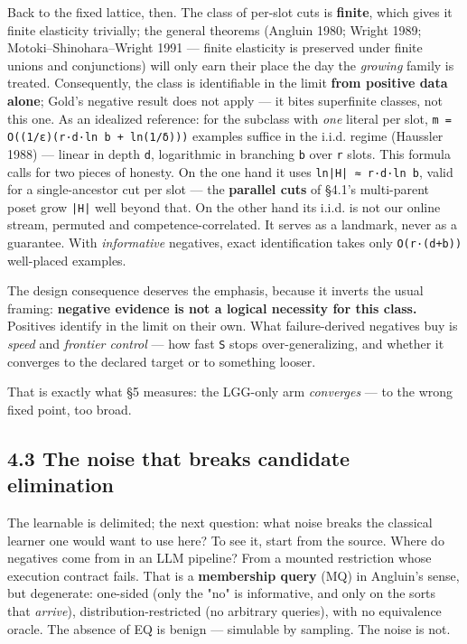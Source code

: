 \documentclass[11pt]{article}
\begin{document}
Back to the fixed lattice, then. The class of per-slot cuts is \textbf{finite}, which gives it finite elasticity trivially; the general theorems (Angluin 1980; Wright 1989; Motoki–Shinohara–Wright 1991 — finite elasticity is preserved under finite unions and conjunctions) will only earn their place the day the \emph{growing} family is treated. Consequently, the class is identifiable in the limit \textbf{from positive data alone}; Gold's negative result does not apply — it bites superfinite classes, not this one. As an idealized reference: for the subclass with \emph{one} literal per slot, \texttt{m = O((1/ε)(r·d·ln b + ln(1/δ)))} examples suffice in the i.i.d. regime (Haussler 1988) — linear in depth \texttt{d}, logarithmic in branching \texttt{b} over \texttt{r} slots. This formula calls for two pieces of honesty. On the one hand it uses \texttt{ln|H| ≈ r·d·ln b}, valid for a single-ancestor cut per slot — the \textbf{parallel cuts} of §4.1's multi-parent poset grow \texttt{|H|} well beyond that. On the other hand its i.i.d. is not our online stream, permuted and competence-correlated. It serves as a landmark, never as a guarantee. With \emph{informative} negatives, exact identification takes only \texttt{O(r·(d+b))} well-placed examples.

The design consequence deserves the emphasis, because it inverts the usual framing: \textbf{negative evidence is not a logical necessity for this class.} Positives identify in the limit on their own. What failure-derived negatives buy is \emph{speed} and \emph{frontier control} — how fast \texttt{S} stops over-generalizing, and whether it converges to the declared target or to something looser.

That is exactly what §5 measures: the LGG-only arm \emph{converges} — to the wrong fixed point, too broad.

\subsection*{4.3 The noise that breaks candidate elimination}

The learnable is delimited; the next question: what noise breaks the classical learner one would want to use here? To see it, start from the source. Where do negatives come from in an LLM pipeline? From a mounted restriction whose execution contract fails. That is a \textbf{membership query} (MQ) in Angluin's sense, but degenerate: one-sided (only the "no" is informative, and only on the sorts that \emph{arrive}), distribution-restricted (no arbitrary queries), with no equivalence oracle. The absence of EQ is benign — simulable by sampling. The noise is not.
\end{document}
